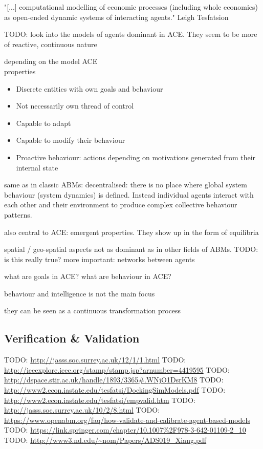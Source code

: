 "[...] computational modelling of economic processes (including whole economies) as open-ended dynamic systems of interacting agents." Leigh Tesfatsion

TODO: look into the models of agents dominant in ACE. They seem to be more of reactive, continuous nature

depending on the model ACE \\

properties
\begin{itemize}
\item Discrete entities with own goals and behaviour
\item Not necessarily own thread of control
\item Capable to adapt 
\item Capable to modify their behaviour
\item Proactive behaviour: actions depending on motivations generated from their internal state
\end{itemize}

same as in classic ABMs: decentralised: there is no place where global system behaviour (system dynamics) is defined. Instead individual agents interact with each other and their environment to produce complex collective behaviour patterns.

also central to ACE: emergent properties. They show up in the form of equilibria

spatial / geo-spatial aspects not as dominant as in other fields of ABMs. TODO: is this really true?
more important: networks between agents

what are goals in ACE?
what are behaviour in ACE?

behaviour and intelligence is not the main focus

they can be seen as a continuous transformation process

\subsection{Verification \& Validation}
TODO: \url{http://jasss.soc.surrey.ac.uk/12/1/1.html}
TODO: \url{http://ieeexplore.ieee.org/stamp/stamp.jsp?arnumber=4419595}
TODO: \url{http://dspace.stir.ac.uk/handle/1893/3365#.WNjO1DsrKM8}
TODO: \url{http://www2.econ.iastate.edu/tesfatsi/DockingSimModels.pdf}
TODO: \url{http://www2.econ.iastate.edu/tesfatsi/empvalid.htm}
TODO: \url{http://jasss.soc.surrey.ac.uk/10/2/8.html}
TODO: \url{https://www.openabm.org/faq/how-validate-and-calibrate-agent-based-models}
TODO: \url{https://link.springer.com/chapter/10.1007%2F978-3-642-01109-2_10}
TODO: \url{http://www3.nd.edu/~nom/Papers/ADS019_Xiang.pdf}


